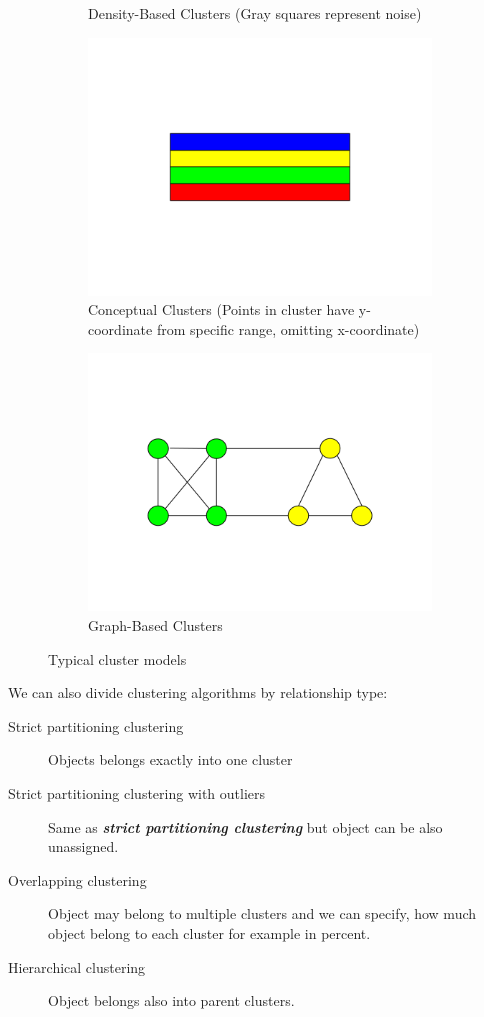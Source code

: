 \begin{figure}[h]
\begin{subfigure}{.5\textwidth}
  \caption{Density-Based Clusters (Gray squares represent noise)}
  \label{fig:densityClusters}
\end{subfigure}%
\vspace*{0.5cm} 
\begin{subfigure}{.5\textwidth}
  \centering
  \includegraphics[width=.5\linewidth]{img/conceptualClusters.png}
  \caption{Conceptual Clusters (Points in cluster have y-coordinate from specific range, omitting x-coordinate)}
  \label{fig:conceptualClusters}
\end{subfigure}%
\begin{subfigure}{.5\textwidth}
  \centering
  \includegraphics[width=.5\linewidth]{img/graphClusters.png}
  \caption{Graph-Based Clusters}
  \label{fig:graphClusters}
\end{subfigure}%
\caption{Typical cluster models}
\end{figure}

We can also divide clustering algorithms by relationship type:

\begin{description}
\item[Strict partitioning clustering] Objects belongs exactly into one cluster
\item[Strict partitioning clustering with outliers] Same as \textit{\textbf{strict partitioning clustering}} but object can be also unassigned. 
\item[Overlapping clustering] Object may belong to multiple clusters and we can specify, how much object belong to each cluster for example in percent.
\item[Hierarchical clustering] Object belongs also into parent clusters.
\end{description}

